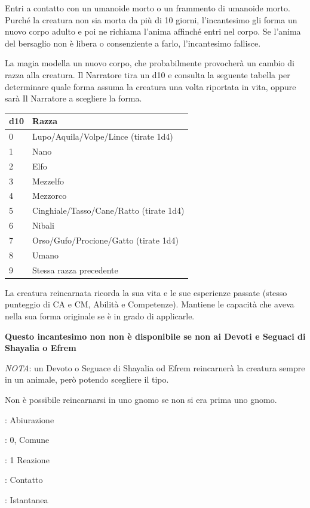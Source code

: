 \begin{multicols}{2}
Entri a contatto con un umanoide morto o un frammento di umanoide morto. Purché la creatura non sia morta da più di 10 giorni, l'incantesimo gli forma un nuovo corpo adulto e poi ne richiama l'anima affinché entri nel corpo. Se l'anima del bersaglio non è libera o consenziente a farlo, l'incantesimo fallisce.

La magia modella un nuovo corpo, che probabilmente provocherà un cambio di razza alla creatura. Il Narratore tira un d10 e consulta la seguente tabella per determinare quale forma assuma la creatura una volta riportata in vita, oppure sarà Il Narratore a scegliere la forma.

\medskip

\noindent\begin{tabular}{ll}
	\toprule
	\textbf{d10} &\textbf{Razza}\\
	\toprule
	0 & Lupo/Aquila/Volpe/Lince (tirate 1d4)\\
	1&Nano\\
	2&Elfo\\
	3&Mezzelfo\\
	4&Mezzorco\\
	5&Cinghiale/Tasso/Cane/Ratto (tirate 1d4)\\
	6&Nibali\\
	7&Orso/Gufo/Procione/Gatto (tirate 1d4)\\
	8&Umano\\
	9&Stessa razza precedente
\end{tabular}

\medskip

La creatura reincarnata ricorda la sua vita e le sue esperienze passate (stesso punteggio di CA e CM, Abilità e Competenze). Mantiene le capacità che aveva nella sua forma originale se è in grado di applicarle.

\textbf{Questo incantesimo non non è disponibile se non ai Devoti e Seguaci di Shayalia o Efrem}

\emph{NOTA}: un Devoto o Seguace di Shayalia od Efrem reincarnerà la creatura sempre in un animale, però potendo scegliere il tipo.

Non è possibile reincarnarsi in uno gnomo se non si era prima uno gnomo.

\noindent\colorbox{OBSSgold!10}{
\begin{minipage}{0.95\linewidth}
\begin{description}[noitemsep, topsep=0pt, parsep=0pt, partopsep=0pt, leftmargin=0cm, labelwidth=1.3cm]
	\item[\textbf{Lista}]: Abiurazione
	\item[\textbf{Livello}]: 0, Comune
	\item[\textbf{Lancio}]: 1 Reazione
	\item[\textbf{Gittata}]: Contatto
	\item[\textbf{Durata}]: Istantanea
\end{description}
\end{minipage}}\smallskip


\end{multicols}
